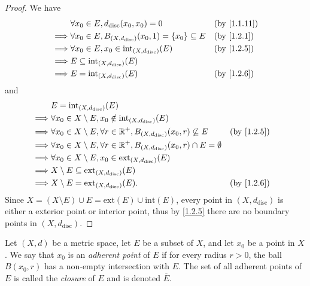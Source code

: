 \begin{proof}
  We have
  \begin{align*}
             & \forall x_0 \in E, d_{\text{disc}}(x_0, x_0) = 0                          &  & \by{1.1.11} \\
    \implies & \forall x_0 \in E, B_{(X, d_{\text{disc}})}(x_0, 1) = \{x_0\} \subseteq E &  & \by{1.2.1}  \\
    \implies & \forall x_0 \in E, x_0 \in \text{int}_{(X, d_{\text{disc}})}(E)           &  & \by{1.2.5}  \\
    \implies & E \subseteq \text{int}_{(X, d_{\text{disc}})}(E)                                           \\
    \implies & E = \text{int}_{(X, d_{\text{disc}})}(E)                                  &  & \by{1.2.6}
  \end{align*}
  and
  \begin{align*}
             & E = \text{int}_{(X, d_{\text{disc}})}(E)                                                                               \\
    \implies & \forall x_0 \in X \setminus E, x_0 \notin \text{int}_{(X, d_{\text{disc}})}(E)                                         \\
    \implies & \forall x_0 \in X \setminus E, \forall r \in \R^+, B_{(X, d_{\text{disc}})}(x_0, r) \not\subseteq E    &  & \by{1.2.5} \\
    \implies & \forall x_0 \in X \setminus E, \forall r \in \R^+, B_{(X, d_{\text{disc}})}(x_0, r) \cap E = \emptyset                 \\
    \implies & \forall x_0 \in X \setminus E, x_0 \in \text{ext}_{(X, d_{\text{disc}})}(E)                                            \\
    \implies & X \setminus E \subseteq \text{ext}_{(X, d_{\text{disc}})}(E)                                                           \\
    \implies & X \setminus E = \text{ext}_{(X, d_{\text{disc}})}(E).                                                  &  & \by{1.2.6}
  \end{align*}
  Since \(X = (X \setminus E) \cup E = \text{ext}(E) \cup \text{int}(E)\), every point in \((X, d_{\text{disc}})\) is either a exterior point or interior point, thus by \cref{1.2.5} there are no boundary points in \((X, d_{\text{disc}})\).
\end{proof}

\begin{defn}[Closure]\label{1.2.9}
  Let \((X, d)\) be a metric space, let \(E\) be a subset of \(X\), and let \(x_0\) be a point in \(X\).
  We say that \(x_0\) is an \emph{adherent point} of \(E\) if for every radius \(r > 0\), the ball \(B(x_0, r)\) has a non-empty intersection with \(E\).
  The set of all adherent points of \(E\) is called the \emph{closure} of \(E\) and is denoted \(\overline{E}\).
\end{defn}

